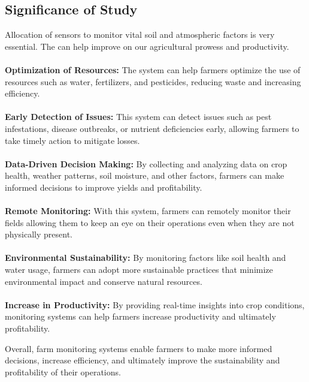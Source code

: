 \documentclass[12pt, a4paper]{article}
\begin{document}
\newpage
\subsection{Significance of Study}
Allocation of sensors to monitor vital soil and atmospheric factors is very essential. The can help improve on our agricultural prowess and productivity. 
\\ \\
\textbf{Optimization of Resources:} The system can help farmers optimize the use of resources such as water, fertilizers, and pesticides, reducing waste and increasing efficiency.
\\ \\
\textbf{Early Detection of Issues:} This system can detect issues such as pest infestations, disease outbreaks, or nutrient deficiencies early, allowing farmers to take timely action to mitigate losses.
\\ \\
\textbf{Data-Driven Decision Making:} By collecting and analyzing data on crop health, weather patterns, soil moisture, and other factors, farmers can make informed decisions to improve yields and profitability.
\\ \\
\textbf{Remote Monitoring:} With this system, farmers can remotely monitor their fields allowing them to keep an eye on their operations even when they are not physically present.
\\ \\
\textbf{Environmental Sustainability:} By monitoring factors like soil health and water usage, farmers can adopt more sustainable practices that minimize environmental impact and conserve natural resources.
\\ \\
\textbf{Increase in Productivity:} By providing real-time insights into crop conditions, monitoring systems can help farmers increase productivity and ultimately profitability.


Overall, farm monitoring systems enable farmers to make more informed decisions, increase efficiency, and ultimately improve the sustainability and profitability of their operations.

\newpage
\end{document}
